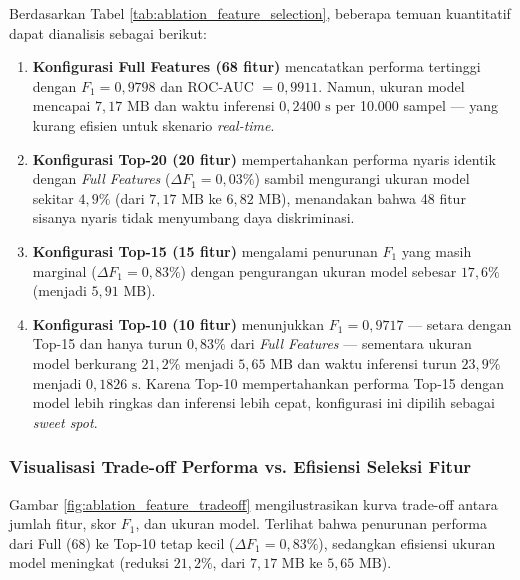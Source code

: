 \documentclass[11pt, a4paper]{article}
\begin{document}
Berdasarkan Tabel \ref{tab:ablation_feature_selection}, beberapa temuan kuantitatif dapat dianalisis sebagai berikut:
\begin{enumerate}
    \item \textbf{Konfigurasi Full Features (68 fitur)} mencatatkan performa tertinggi dengan $F_1 = 0{,}9798$ dan ROC-AUC $= 0{,}9911$. Namun, ukuran model mencapai $7{,}17\text{ MB}$ dan waktu inferensi $0{,}2400\text{ s}$ per 10.000 sampel --- yang kurang efisien untuk skenario \textit{real-time}.
    \item \textbf{Konfigurasi Top-20 (20 fitur)} mempertahankan performa nyaris identik dengan \textit{Full Features} ($\Delta F_1 = 0{,}03\%$) sambil mengurangi ukuran model sekitar $4{,}9\%$ (dari $7{,}17\text{ MB}$ ke $6{,}82\text{ MB}$), menandakan bahwa 48 fitur sisanya nyaris tidak menyumbang daya diskriminasi.
    \item \textbf{Konfigurasi Top-15 (15 fitur)} mengalami penurunan $F_1$ yang masih marginal ($\Delta F_1 = 0{,}83\%$) dengan pengurangan ukuran model sebesar $17{,}6\%$ (menjadi $5{,}91\text{ MB}$).
    \item \textbf{Konfigurasi Top-10 (10 fitur)} menunjukkan $F_1 = 0{,}9717$ --- setara dengan Top-15 dan hanya turun $0{,}83\%$ dari \textit{Full Features} --- sementara ukuran model berkurang $21{,}2\%$ menjadi $5{,}65\text{ MB}$ dan waktu inferensi turun $23{,}9\%$ menjadi $0{,}1826\text{ s}$. Karena Top-10 mempertahankan performa Top-15 dengan model lebih ringkas dan inferensi lebih cepat, konfigurasi ini dipilih sebagai \textit{sweet spot}.
\end{enumerate}

\subsubsection{Visualisasi Trade-off Performa vs. Efisiensi Seleksi Fitur}
Gambar \ref{fig:ablation_feature_tradeoff} mengilustrasikan kurva trade-off antara jumlah fitur, skor $F_1$, dan ukuran model. Terlihat bahwa penurunan performa dari Full (68) ke Top-10 tetap kecil ($\Delta F_1 = 0{,}83\%$), sedangkan efisiensi ukuran model meningkat (reduksi $21{,}2\%$, dari $7{,}17\text{ MB}$ ke $5{,}65\text{ MB}$).
\end{document}
